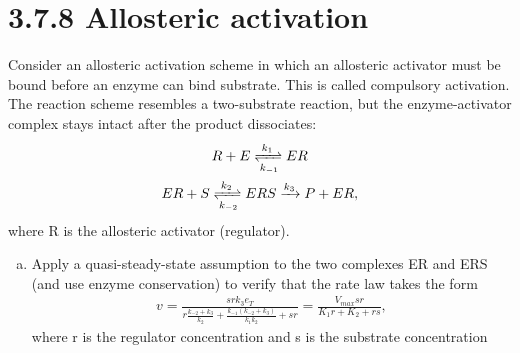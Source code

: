 \documentclass[paper=a4, fontsize=11pt]{scrartcl} %
\numberwithin{equation}{section} %
\numberwithin{figure}{section} %
\numberwithin{table}{section} %
\begin{document}
\section{3.7.8 Allosteric activation}
	Consider an allosteric activation scheme in which an allosteric activator must be bound before an enzyme can bind substrate. This is called compulsory activation. The reaction scheme resembles a two-substrate reaction, but the enzyme-activator complex stays intact after the product dissociates:
	\begin{gather*}
		R + E \xrightleftharpoons[k_{-1}]{k_1} ER\\
		ER + S \xrightleftharpoons[k_{-2}]{k_2} ERS \xrightarrow{k_3} P + ER,
	\end{gather*}
	where R is the allosteric activator (regulator).
	\begin{enumerate}[a)]
		\item  Apply a quasi-steady-state assumption to the two complexes ER and ERS (and use enzyme conservation) to verify that the rate law takes the form
		\begin{gather*}
			v=\frac{srk_3e_T}{r\frac{k_{-2}+k_3}{k_2}+\frac{k_{-1}(k_{-2}+k_3)}{k_1k_2}+sr}=\frac{V_{max}sr}{K_1r+K_2+rs},
		\end{gather*}
		where r is the regulator concentration and s is the substrate concentration


\end{enumerate}
\end{document}
